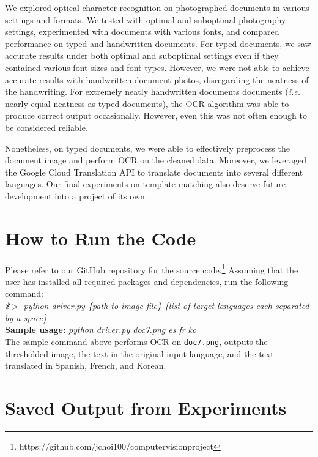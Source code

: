 \documentclass[11pt,letterpaper]{article}
\begin{document}
We explored optical character recognition on photographed documents in various settings and formats. We tested with optimal and suboptimal photography settings, experimented with documents with various fonts, and compared performance on typed and handwritten documents. For typed documents, we saw accurate results under both optimal and suboptimal settings even if they contained various font sizes and font types. However, we were not able to achieve accurate results with handwritten document photos, disregarding the neatness of the handwriting. For extremely neatly handwritten documents documents (\textit{i.e.} nearly equal neatness as typed documents), the OCR algorithm was able to produce correct output occasionally. However, even this was not often enough to be considered reliable. 

Nonetheless, on typed documents, we were able to effectively preprocess the document image and perform OCR on the cleaned data. Moreover, we leveraged the Google Cloud Translation API to translate documents into several different languages. Our final experiments on template matching also deserve future development into a project of its own.

\section*{How to Run the Code}

Please refer to our GitHub repository for the source code.\footnote{https://github.com/jchoi100/computer\textunderscore vision\textunderscore project} Assuming that the user has installed all required packages and dependencies, run the following command:\\

\textit{\$$>$ python driver.py \{path-to-image-file\} \{list of target languages each separated by a space\}}\\

\textbf{Sample usage:} \textit{python driver.py doc7.png es fr ko}\\

The sample command above performs OCR on {\tt doc7.png}, outputs the thresholded image, the text in the original input language, and the text translated in Spanish, French, and Korean.

\section*{Saved Output from Experiments}
\end{document}
